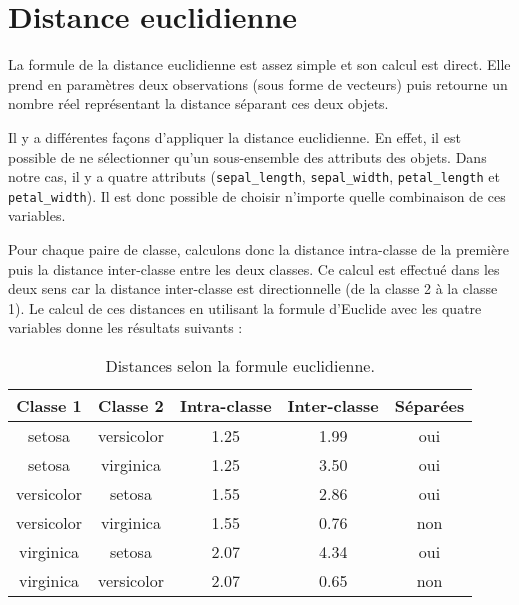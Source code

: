 \documentclass[french]{report}
\begin{document}
    \section{Distance euclidienne}
    
    La formule de la distance euclidienne est assez simple et son calcul est direct.
    Elle prend en paramètres deux observations (sous forme de vecteurs) puis retourne un nombre réel représentant la distance séparant ces deux objets.
    
    Il y a différentes façons d'appliquer la distance euclidienne.
    En effet, il est possible de ne sélectionner qu'un sous-ensemble des attributs des objets.
    Dans notre cas, il y a quatre attributs (\texttt{sepal\_length}, \texttt{sepal\_width}, \texttt{petal\_length} et \texttt{petal\_width}).
    Il est donc possible de choisir n'importe quelle combinaison de ces variables.
    
    Pour chaque paire de classe, calculons donc la distance intra-classe de la première puis la distance inter-classe entre les deux classes.
    Ce calcul est effectué dans les deux sens car la distance inter-classe est directionnelle (de la classe 2 à la classe 1).
    Le calcul de ces distances en utilisant la formule d'Euclide avec les quatre variables donne les résultats suivants :
    
    \begin{table}[h]
        \centering
        \begin{tabular}{||c c c c c||}
            \hline
            \textbf{Classe 1} & \textbf{Classe 2} & \textbf{Intra-classe} & \textbf{Inter-classe} & \textbf{Séparées} \\
            \hline\hline
            setosa & versicolor & 1.25 & 1.99 & {\color{ForestGreen}oui} \\
            setosa & virginica & 1.25 & 3.50 & {\color{ForestGreen}oui} \\
            \hline
            versicolor & setosa & 1.55 & 2.86 & {\color{ForestGreen}oui} \\
            versicolor & virginica & 1.55 & 0.76 & {\color{BrickRed}non} \\
            \hline
            virginica & setosa & 2.07 & 4.34 & {\color{ForestGreen}oui} \\
            virginica & versicolor & 2.07 & 0.65 & {\color{BrickRed}non} \\
            \hline
        \end{tabular}
        \caption{Distances selon la formule euclidienne.}
    \end{table}
    \leavevmode
    
\end{document}
